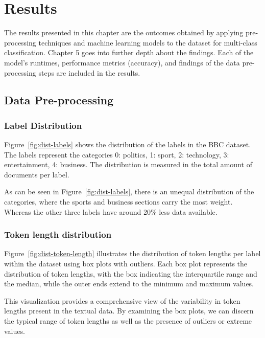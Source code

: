 \chapter{Results}

The results presented in this chapter are the outcomes obtained by applying pre-processing techniques and machine learning models to the dataset for multi-class classification. Chapter 5 goes into further depth about the findings. Each of the model’s runtimes, performance metrics (accuracy), and findings of the data pre-processing steps are included in the results. 

\section{Data Pre-processing}
\subsection{Label Distribution}


Figure~\ref{fig:dist-labels} shows the distribution of the labels in the BBC dataset. The labels represent the categories 0: politics, 1: sport, 2: technology, 3: entertainment, 4: business. The distribution is measured in the total amount of documents per label.

As can be seen in Figure~\ref{fig:dist-labels}, there is an unequal distribution of the categories, where the sports and business sections carry the most weight. Whereas the other three labels have around 20\% less data available.

\subsection{Token length distribution}


Figure~\ref{fig:dist-token-length} illustrates the distribution of token lengths per label within the dataset using box plots with outliers. Each box plot represents the distribution of token lengths, with the box indicating the interquartile range and the median, while the outer ends extend to the minimum and maximum values.

This visualization provides a comprehensive view of the variability in token lengths present in the textual data. By examining the box plots, we can discern the typical range of token lengths as well as the presence of outliers or extreme values.

